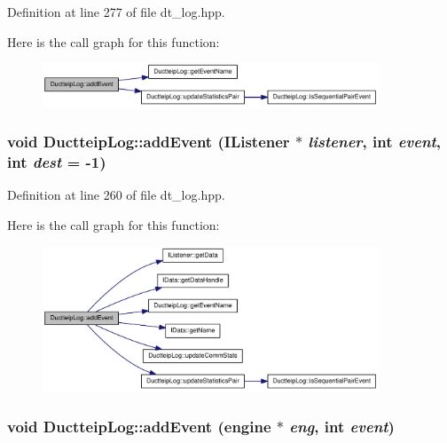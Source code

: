 Definition at line 277 of file dt\_\-log.hpp.

Here is the call graph for this function:\nopagebreak
\begin{figure}[H]
\begin{center}
\leavevmode
\includegraphics[width=284pt]{class_ductteip_log_adfbc05d93e6d90fc9a2f5a4e74578095_cgraph}
\end{center}
\end{figure}
\hypertarget{class_ductteip_log_a1bbfbd418561ea58f630f3c5f57694c8}{
\subsubsection[{addEvent}]{\setlength{\rightskip}{0pt plus 5cm}void DuctteipLog::addEvent ({\bf IListener} $\ast$ {\em listener}, \/  int {\em event}, \/  int {\em dest} = {\ttfamily -\/1})}}
\label{class_ductteip_log_a1bbfbd418561ea58f630f3c5f57694c8}


Definition at line 260 of file dt\_\-log.hpp.

Here is the call graph for this function:\nopagebreak
\begin{figure}[H]
\begin{center}
\leavevmode
\includegraphics[width=284pt]{class_ductteip_log_a1bbfbd418561ea58f630f3c5f57694c8_cgraph}
\end{center}
\end{figure}
\hypertarget{class_ductteip_log_afb6106d874d89989c58027cc1ac569e4}{
\subsubsection[{addEvent}]{\setlength{\rightskip}{0pt plus 5cm}void DuctteipLog::addEvent ({\bf engine} $\ast$ {\em eng}, \/  int {\em event})}}
\label{class_ductteip_log_afb6106d874d89989c58027cc1ac569e4}


